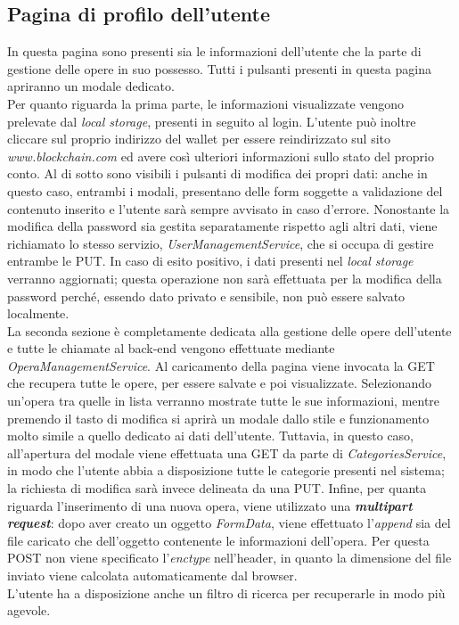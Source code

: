\documentclass[11pt]{article}
\begin{document}
\subsection{Pagina di profilo dell'utente}
In questa pagina sono presenti sia le informazioni dell'utente che la parte di gestione delle opere in suo possesso. Tutti i pulsanti presenti in questa pagina apriranno un modale dedicato.\\
Per quanto riguarda la prima parte, le informazioni visualizzate vengono prelevate dal \textit{local storage}, presenti in seguito al login. L'utente può inoltre cliccare sul proprio indirizzo del wallet per essere reindirizzato sul sito \textit{www.blockchain.com} ed avere così ulteriori informazioni sullo stato del proprio conto. Al di sotto sono visibili i pulsanti di modifica dei propri dati: anche in questo caso, entrambi i modali, presentano delle form soggette a validazione del contenuto inserito e l'utente sarà sempre avvisato in caso d'errore. Nonostante la modifica della password sia gestita separatamente rispetto agli altri dati, viene richiamato lo stesso servizio, \textit{UserManagementService}, che si occupa di gestire entrambe le PUT. In caso di esito positivo, i dati presenti nel \textit{local storage} verranno aggiornati; questa operazione non sarà effettuata per la modifica della password perché, essendo dato privato e sensibile, non può essere salvato localmente.\\
La seconda sezione è completamente dedicata alla gestione delle opere dell'utente e tutte le chiamate al back-end vengono effettuate mediante \textit{OperaManagementService}. Al caricamento della pagina viene invocata la GET che recupera tutte le opere, per essere salvate e poi visualizzate. Selezionando un'opera tra quelle in lista verranno mostrate tutte le sue informazioni, mentre premendo il tasto di modifica si aprirà un modale dallo stile e funzionamento molto simile a quello dedicato ai dati dell'utente. Tuttavia, in questo caso, all'apertura del modale viene effettuata una GET da parte di \textit{CategoriesService}, in modo che l'utente abbia a disposizione tutte le categorie presenti nel sistema; la richiesta di modifica sarà invece delineata da una PUT. Infine, per quanta riguarda l'inserimento di una nuova opera, viene utilizzato una \textit{\textbf{multipart request}}: dopo aver creato un oggetto \textit{FormData}, viene effettuato l'\textit{append} sia del file caricato che dell'oggetto contenente le informazioni dell'opera. Per questa POST non viene specificato l'\textit{enctype} nell'header, in quanto la dimensione del file inviato viene calcolata automaticamente dal browser.\\
L'utente ha a disposizione anche un filtro di ricerca per recuperarle in modo più agevole.
\end{document}
